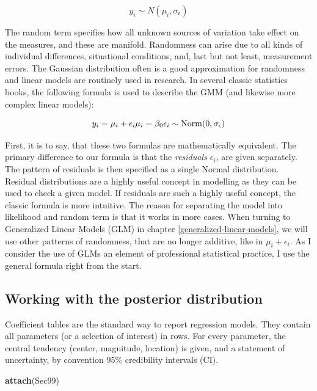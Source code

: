 \documentclass[]{svmono}
\newenvironment{Shaded}{\begin{snugshade}}{\end{snugshade}}
\newcommand{\KeywordTok}[1]{\textcolor[rgb]{0.13,0.29,0.53}{\textbf{#1}}}
\newcommand{\NormalTok}[1]{#1}
\begin{document}
\[y_i \sim N(\mu_i, \sigma_{\epsilon})\]

The random term specifies how all unknown sources of variation take
effect on the measures, and these are manifold. Randomness can arise due
to all kinds of individual differences, situational conditions, and,
last but not least, measurement errors. The Gaussian distribution often
is a good approximation for randomness and linear models are routinely
used in research. In several classic statistics books, the following
formula is used to describe the GMM (and likewise more complex linear
models):

\[
y_i = \mu_i + \epsilon_i\\
\mu_i = \beta_0\\
\epsilon_i \sim \textrm{Norm}(0, \sigma_\epsilon)
\]

First, it is to say, that these two formulas are mathematically
equivalent. The primary difference to our formula is that the
\emph{residuals \(\epsilon_i\)}, are given separately. The pattern of
residuals is then specified as a single Normal distribution. Residual
distributions are a highly useful concept in modelling as they can be
used to check a given model. If residuals are such a highly useful
concept, the classic formula is more intuitive. The reason for
separating the model into likelihood and random term is that it works in
more cases. When turning to Generalized Linear Models (GLM) in chapter
\ref{generalized-linear-models}, we will use other patterns of
randomness, that are no longer additive, like in \(\mu_i + \epsilon_i\).
As I consider the use of GLMs an element of professional statistical
practice, I use the general formula right from the start.

\subsection{Working with the posterior
distribution}\label{working-with-the-posterior-distribution}

Coefficient tables are the standard way to report regression models.
They contain all parameters (or a selection of interest) in rows. For
every parameter, the central tendency (center, magnitude, location) is
given, and a statement of uncertainty, by convention 95\% credibility
intervals (CI).

\begin{Shaded}
\begin{Highlighting}[]
\KeywordTok{attach}\NormalTok{(Sec99)}
\end{Highlighting}
\end{Shaded}
\end{document}
